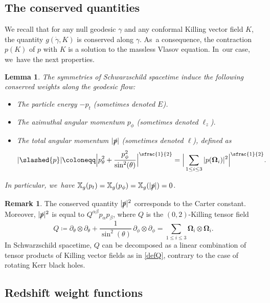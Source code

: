 \documentclass[JEP,XML,SOM,Unicode,published]{cedram}
\theoremstyle{plain}
\newtheorem{lemma}[proposition]{Lemma}
\theoremstyle{definition}
\newtheorem{remark}[proposition]{Remark}
\newcommand\T{{\mathbb{X}}}
\begin{document}
\subsection{The conserved quantities}

We recall that for any null geodesic $\gamma$ and any conformal Killing vector field $K$, the quantity $g(\dot{\gamma},K)$ is conserved along $\gamma$. As~a consequence, the contraction $p(K)$ of $p$ with $K$ is a solution to the massless Vlasov equation. In~our case, we~have the next properties.

\begin{lemma}\label{Lemconsqua}
The symmetries of Schwarzschild spacetime induce the following conserved weights along the geodesic flow:
\begin{itemize}
\item The \textit{particle energy} $-p_t$ (sometimes denoted $E$).
\item The \textit{azimuthal angular momentum} $p_\phi$ (sometimes denoted $\ell_z$).
\item The \textit{total angular momentum} $|\slashed{p}|$ (sometimes denoted $\ell$), defined as
\[
|\slashed{p}| \coloneqq \Big| p_\theta^2+ \frac{p_\phi^2}{\sin^2 (\theta)} \Big|^{\sfrac{1}{2}}= \Big|\sum_{1 \leq i \leq 3} |p(\mathbf{\Omega}_i)|^2\Big|^{\sfrac{1}{2}}.
\]
\end{itemize}
In particular, we~have $\T_g (p_t)=\T_g(p_\phi)=\T_g (|\slashed{p}|)=0$.
\end{lemma}
\begin{remark}
The conserved quantity $|\slashed{p}|^2$ corresponds to the Carter constant. Moreover, $|\slashed{p}|^2$ is equal to $Q^{\alpha \beta}p_\alpha p_\beta$, where $Q$ is the $(0,2)$-Killing tensor field
\begin{equation}\label{defQ}
Q\coloneqq \partial_\theta \otimes \partial_\theta+\frac{1}{\sin^2 (\theta) }\, \partial_\phi \otimes \partial_\phi = \sum_{1 \leq i \leq 3} \mathbf{\Omega}_i \otimes \mathbf{\Omega}_i.
\end{equation}
In Schwarzschild spacetime, $Q$ can be decomposed as a linear combination of tensor products of Killing vector fields as in \eqref{defQ}, contrary to the case of rotating Kerr black holes.
\end{remark}

\subsection{Redshift weight functions}\label{Subsecredshift}
\end{document}
